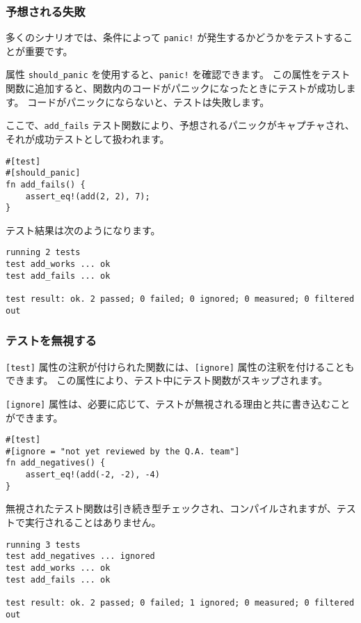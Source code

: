 \subsubsection{予想される失敗}

多くのシナリオでは、条件によって \texttt{panic!} が発生するかどうかをテストすることが重要です。

属性 \texttt{should\_panic} を使用すると、\texttt{panic!} を確認できます。 この属性をテスト関数に追加すると、関数内のコードがパニックになったときにテストが成功します。 コードがパニックにならないと、テストは失敗します。

ここで、\texttt{add\_fails} テスト関数により、予想されるパニックがキャプチャされ、それが成功テストとして扱われます。

\begin{lstlisting}[numbers=none]
#[test]
#[should_panic]
fn add_fails() {
    assert_eq!(add(2, 2), 7);
}
\end{lstlisting}

テスト結果は次のようになります。

\begin{lstlisting}[numbers=none]
running 2 tests
test add_works ... ok
test add_fails ... ok

test result: ok. 2 passed; 0 failed; 0 ignored; 0 measured; 0 filtered out
\end{lstlisting}

\subsubsection{テストを無視する}

\texttt{[test]} 属性の注釈が付けられた関数には、\texttt{[ignore]} 属性の注釈を付けることもできます。 この属性により、テスト中にテスト関数がスキップされます。

\texttt{[ignore]} 属性は、必要に応じて、テストが無視される理由と共に書き込むことができます。

\begin{lstlisting}[numbers=none]
#[test]
#[ignore = "not yet reviewed by the Q.A. team"]
fn add_negatives() {
    assert_eq!(add(-2, -2), -4)
}
\end{lstlisting}

無視されたテスト関数は引き続き型チェックされ、コンパイルされますが、テストで実行されることはありません。

\begin{lstlisting}[numbers=none]
running 3 tests
test add_negatives ... ignored
test add_works ... ok
test add_fails ... ok

test result: ok. 2 passed; 0 failed; 1 ignored; 0 measured; 0 filtered out
\end{lstlisting}

